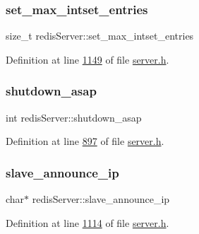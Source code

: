 \subsubsection{\texorpdfstring{set\+\_\+max\+\_\+intset\+\_\+entries}{set\_max\_intset\_entries}}
{\footnotesize\ttfamily size\+\_\+t redis\+Server\+::set\+\_\+max\+\_\+intset\+\_\+entries}



Definition at line \hyperlink{server_8h_source_l01149}{1149} of file \hyperlink{server_8h_source}{server.\+h}.

\mbox{\label{structredisServer_a09f109217dbc8869987a82ed966ff017}} 
\subsubsection{\texorpdfstring{shutdown\+\_\+asap}{shutdown\_asap}}
{\footnotesize\ttfamily int redis\+Server\+::shutdown\+\_\+asap}



Definition at line \hyperlink{server_8h_source_l00897}{897} of file \hyperlink{server_8h_source}{server.\+h}.

\mbox{\label{structredisServer_a0eba76eeb70d2d95ce3fa0f2be662b3b}} 
\subsubsection{\texorpdfstring{slave\+\_\+announce\+\_\+ip}{slave\_announce\_ip}}
{\footnotesize\ttfamily char$\ast$ redis\+Server\+::slave\+\_\+announce\+\_\+ip}



Definition at line \hyperlink{server_8h_source_l01114}{1114} of file \hyperlink{server_8h_source}{server.\+h}.

\mbox{\label{structredisServer_ad513b148aed3e0182fe8de85143ebf69}} 
